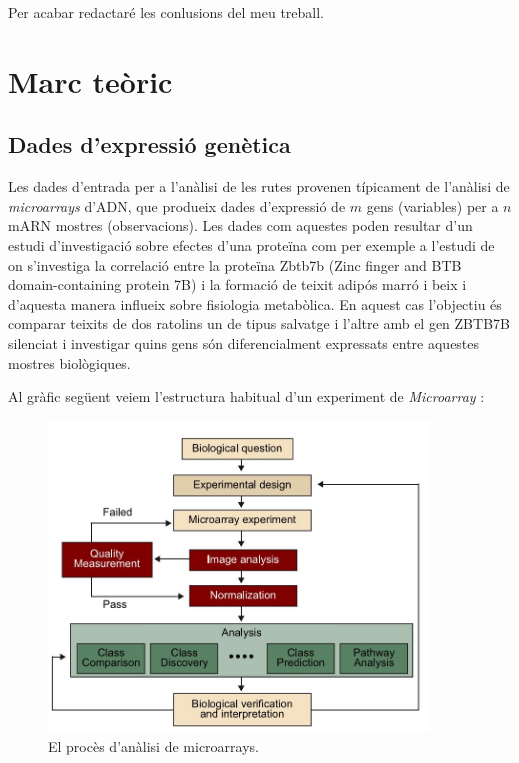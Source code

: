 Per acabar redactaré les conlusions del meu treball.
\chapter{Marc teòric}

\section{Dades d'expressió genètica}
Les dades d'entrada per a l'anàlisi de les rutes provenen típicament de l'anàlisi de \textit{microarrays} d'ADN, que produeix dades d'expressió de $m$ gens (variables) per a $n$ mARN mostres (observacions). Les dades com aquestes poden resultar d'un estudi d'investigació sobre efectes d'una proteïna com per exemple a l'estudi de \cite{li2017zbtb7b} on s'investiga la correlació entre la proteïna Zbtb7b (Zinc finger and BTB domain-containing protein 7B) i la formació de teixit adipós marró i beix i d'aquesta manera influeix sobre fisiologia metabòlica. En aquest cas l'objectiu és comparar teixits de dos ratolins un de tipus salvatge i l'altre amb el gen ZBTB7B silenciat i investigar quins gens són diferencialment expressats entre aquestes mostres biològiques. 

Al gràfic següent veiem l'estructura habitual d'un experiment de \textit{Microarray}  \cite{plaPID00192743}:

\begin{figure}[H]
\centering
\includegraphics[width=0.9\textwidth]{figures/Pipeline_Microarray.jpg} 
\caption{El procès d'anàlisi de microarrays.}
\end{figure}

